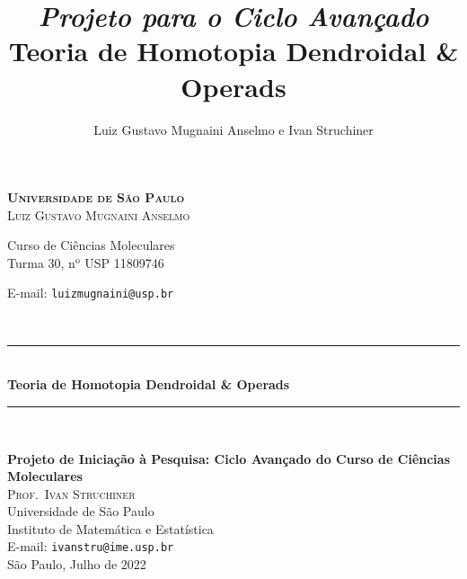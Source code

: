 \documentclass[11pt,reqno]{amsart}
\newcommand{\HRule}{\rule{\linewidth}{0.5mm}} %
\theoremstyle{definition}
\begin{document}
\begin{titlepage}
 \vfill
  \begin{center}
       \textsc{\LARGE \textbf{Universidade de São Paulo}} \\[2.0cm]

       \vskip 0.5cm
       \textsc{\large Luiz Gustavo Mugnaini Anselmo}

       {\normalsize Curso de Ciências Moleculares \\
         Turma 30, n\(^{\text{o}}\)
         USP 11809746

       E-mail: \texttt{luizmugnaini@usp.br}}\\[2.0cm]

       \HRule\\
       \vskip 0.5cm
       {\LARGE \textbf{Teoria de Homotopia Dendroidal \& Operads}}
       \HRule\\[1.5cm]

       \hspace{.45\textwidth}
       \begin{minipage}{.5\textwidth}
         \normalsize \textbf{Projeto de Iniciação à Pesquisa:
           Ciclo Avançado do Curso de Ciências
           Moleculares}\\[0.5cm]

       \textsc{\large Prof.~Ivan Struchiner}\\
       Universidade de São Paulo \\
       Instituto de Matemática e Estatística \\
       E-mail: \texttt{ivanstru@ime.usp.br}\\[1cm]

       \normalsize São Paulo, Julho de 2022
       \end{minipage}
  \end{center}
\end{titlepage}

\title[Teoria de Homotopia Dendroidal \& Operads]{%
{\footnotesize\sl Projeto para o Ciclo Avançado} \\ \smallskip
  Teoria de Homotopia Dendroidal \& Operads
}%

\author{%
  Luiz Gustavo Mugnaini Anselmo e Ivan Struchiner
}%

\address{%
  Instituto de Matemática e Estatística, Universidade de São
  Paulo, Rua do Matão 1010, 05508--090~São Paulo, SP
}%

\end{document}
